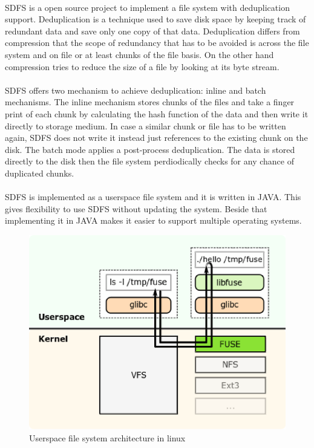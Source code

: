 \paragraph{}
SDFS is a open source project to implement a file system with deduplication support. Deduplication is a technique
used to save disk space by keeping track of redundant data and save only one copy of that data. Deduplication differs
from compression that the scope of redundancy that has to be avoided is across the file system and on file or at
 least chunks of the file basis. On the other hand compression tries to reduce the size of a file by looking at its byte stream.

\paragraph{}
SDFS offers two mechanism to achieve deduplication: inline and batch mechanisms. The inline mechanism stores chunks of the files and
take a finger print of each chunk by calculating the hash function of the data and then write it directly to storage medium. In case
a similar chunk or file has to be written again, SDFS does not write it instead just references to the existing chunk on the disk.
The batch mode applies a post-process deduplication. The data is stored directly to the disk then the file system perdiodically checks 
for any chance of duplicated chunks.



\paragraph{}
SDFS is implemented as a userspace file system and it is written in JAVA. This gives flexibility to use SDFS without updating the system.
Beside that implementing it in JAVA makes it easier to support multiple operating systems.
\begin{figure}
\begin{center}
\includegraphics[scale=.55]{FUSE.eps}
\caption{Userspace file system architecture in linux\cite{web:wiki-fuse}}
\label{fig:fuse}
\end{center}
\end{figure}


